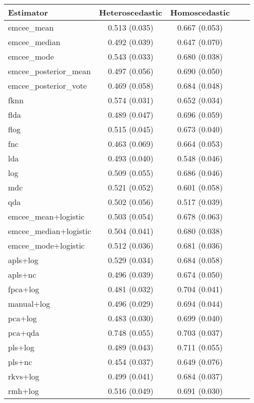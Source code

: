 \begin{table}[p]
  \centering
  \begin{tabular}{lcccc}
\toprule
            \textbf{Estimator} &            \textbf{Heteroscedastic} &           \textbf{Homoscedastic}\\
\midrule

          emcee\_mean &   0.513 (0.035) & 0.667 (0.053) \\
        emcee\_median &   0.492 (0.039) & 0.647 (0.070) \\
          emcee\_mode &   0.543 (0.033) & 0.680 (0.038) \\
emcee\_posterior\_mean &   0.497 (0.056) & 0.690 (0.050) \\
emcee\_posterior\_vote &   0.469 (0.058) & 0.684 (0.048) \\
                fknn &   0.574 (0.031) & 0.652 (0.034) \\
                flda &   0.489 (0.047) & 0.696 (0.059) \\
                flog &   0.515 (0.045) & 0.673 (0.040) \\
                 fnc &   0.463 (0.069) & 0.664 (0.053) \\
                 lda &   0.493 (0.040) & 0.548 (0.046) \\
                 log &   0.509 (0.055) & 0.686 (0.046) \\
                 mdc &   0.521 (0.052) & 0.601 (0.058) \\
                 qda &   0.502 (0.056) & 0.517 (0.039) \\

\bottomrule
\toprule

  emcee\_mean+logistic &   0.503 (0.054) & 0.678 (0.063) \\
emcee\_median+logistic &   0.504 (0.041) & 0.680 (0.038) \\
  emcee\_mode+logistic &   0.512 (0.036) & 0.681 (0.036) \\
               apls+log &   0.529 (0.034) & 0.684 (0.058) \\
              apls+nc &   0.496 (0.039) & 0.674 (0.050) \\
             fpca+log &   0.481 (0.032) & 0.704 (0.041) \\
           manual+log &   0.496 (0.029) & 0.694 (0.044) \\
              pca+log &   0.483 (0.030) & 0.699 (0.040) \\
              pca+qda &   0.748 (0.055) & 0.703 (0.037) \\
              pls+log &   0.489 (0.043) & 0.711 (0.055) \\
               pls+nc &   0.454 (0.037) & 0.649 (0.076) \\
             rkvs+log &   0.499 (0.041) & 0.684 (0.037) \\
              rmh+log &   0.516 (0.049) & 0.691 (0.030) \\


\end{tabular}
\end{table}

